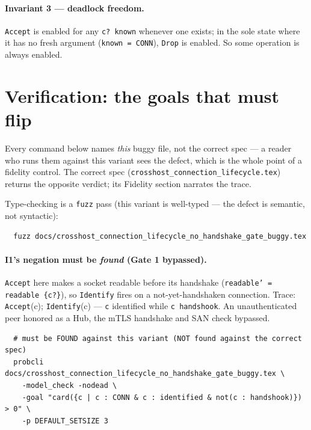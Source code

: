 \documentclass[a4paper,10pt,fleqn]{article}
\begin{document}
\paragraph{Invariant 3 --- deadlock freedom.}
\texttt{Accept} is enabled for any \texttt{c? \notin known} whenever one
exists; in the sole state where it has no fresh argument
(\texttt{known = CONN}), \texttt{Drop} is enabled.  So some operation is
always enabled.

\section{Verification: the goals that must flip}
\label{sec:verify}

Every command below names \emph{this} buggy file, not the correct spec ---
a reader who runs them against this variant sees the defect, which is the
whole point of a fidelity control.  The correct spec
(\texttt{crosshost\_connection\_lifecycle.tex}) returns the opposite
verdict; its Fidelity section narrates the trace.

Type-checking is a \texttt{fuzz} pass (this variant is well-typed --- the
defect is semantic, not syntactic):
\begin{verbatim}
  fuzz docs/crosshost_connection_lifecycle_no_handshake_gate_buggy.tex
\end{verbatim}

\paragraph{I1's negation must be \emph{found} (Gate 1 bypassed).}
\texttt{Accept} here makes a socket readable before its handshake
(\texttt{readable' = readable \cup \{c?\}}), so \texttt{Identify} fires on
a not-yet-handshaken connection.  Trace: \texttt{Accept}(c);
\texttt{Identify}(c) --- \texttt{c} identified while
\texttt{c \notin handshook}.  An unauthenticated peer honored as a Hub,
the mTLS handshake and SAN check bypassed.
\begin{verbatim}
  # must be FOUND against this variant (NOT found against the correct spec)
  probcli docs/crosshost_connection_lifecycle_no_handshake_gate_buggy.tex \
    -model_check -nodead \
    -goal "card({c | c : CONN & c : identified & not(c : handshook)}) > 0" \
    -p DEFAULT_SETSIZE 3
\end{verbatim}
\end{document}
